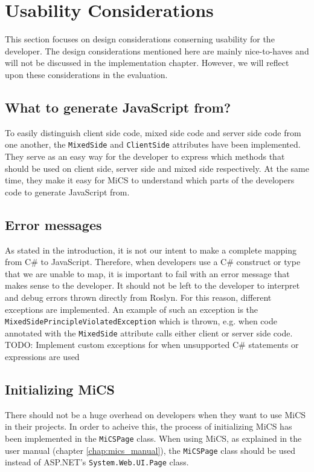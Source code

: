 \section{Usability Considerations}
This section focuses on design considerations conserning usability for the developer. The design considerations mentioned here are mainly nice-to-haves and will not be discussed in the implementation chapter. However, we will reflect upon these considerations in the evaluation.

\subsection{What to generate JavaScript from?} %
\label{sub:what_to_generate_javascript_from}
	To easily distinguish client side code, mixed side code and server side code from one another, the \texttt{MixedSide} and \texttt{ClientSide} attributes have been implemented. They serve as an easy way for the developer to express which methods that should be used on client side, server side and mixed side respectively. At the same time, they make it easy for MiCS to understand which parts of the developers code to generate JavaScript from.


\subsection{Error messages} %
\label{sub:design_error_messages}
	As stated in the introduction, it is not our intent to make a complete mapping from C\# to JavaScript. Therefore, when developers use a C\# construct or type that we are unable to map, it is important to fail with an error message that makes sense to the developer. It should not be left to the developer to interpret and debug errors thrown directly from Roslyn. For this reason, different exceptions are implemented. An example of such an exception is the \texttt{MixedSidePrincipleViolatedException} which is thrown, e.g. when code annotated with the \texttt{MixedSide} attribute calls either client or server side code.
	TODO: Implement custom exceptions for when unsupported C\# statements or expressions are used


\subsection{Initializing MiCS} %
\label{sub:initializng_mics}
	There should not be a huge overhead on developers when they want to use MiCS in their projects. In order to acheive this, the process of initializing MiCS has been implemented in the \texttt{MiCSPage} class. When using MiCS, as explained in the user manual (chapter \ref{chap:mics_manual}), the \texttt{MiCSPage} class should be used instead of ASP.NET's \texttt{System.Web.UI.Page} class.
